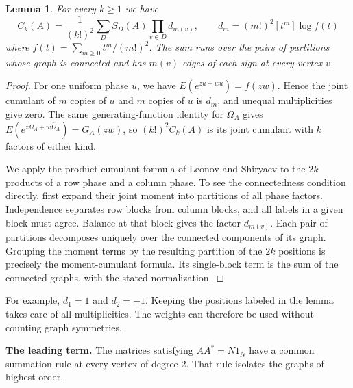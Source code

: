 \documentclass[11pt,a4paper]{article}
\newtheorem{lem}[thm]{Lemma}
\theoremstyle{remark}
\begin{document}
\begin{samepage}
\begin{lem}\label{lem:connected-free}
For every $k\geq1$ we have
\[
 C_k(A)=\frac{1}{(k!)^2}\sum_D S_D(A)\prod_{v\in D}d_{m(v)},
 \qquad d_m=(m!)^2[t^m]\log f(t)
\]
where $f(t)=\sum_{m\geq0}t^m/(m!)^2$. The sum runs over the pairs of
partitions whose graph is connected and has $m(v)$ edges of each sign at
every vertex $v$.
\end{lem}
\end{samepage}
\begin{proof}
For one uniform phase $u$, we have $E(e^{zu+w\bar u})=f(zw)$. Hence the
joint cumulant of $m$ copies of $u$ and $m$ copies of $\bar u$ is $d_m$,
and unequal multiplicities give zero. The same generating-function identity
for $\Omega_A$ gives $E(e^{z\Omega_A+w\bar\Omega_A})=G_A(zw)$, so
$(k!)^2 C_k(A)$ is its joint cumulant with $k$ factors of either kind.

We apply the product-cumulant formula of Leonov and Shiryaev \cite{lsh}
to the $2k$ products of a row phase and a column phase. To see the
connectedness condition directly, first expand their joint moment into
partitions of all phase factors. Independence separates row blocks from
column blocks, and all labels in a given block must agree. Balance at that
block gives the factor $d_{m(v)}$. Each pair of partitions decomposes
uniquely over the connected components of its graph. Grouping the moment
terms by the resulting partition of the $2k$ positions is precisely the
moment-cumulant formula. Its single-block term is the sum of the
connected graphs, with the stated normalization.
\end{proof}

For example, $d_1=1$ and $d_2=-1$. Keeping the positions labeled in the
lemma takes care of all multiplicities. The weights can therefore be
used without counting graph symmetries.

\medskip
\noindent\textbf{The leading term.}
The matrices satisfying $AA^*=N1_N$ have a common summation rule at
every vertex of degree 2. That rule isolates the graphs of highest order.
\end{document}
